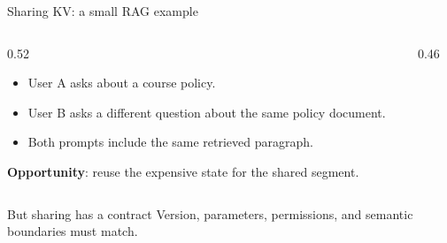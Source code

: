 \documentclass[aspectratio=169,11pt]{beamer}
\newcommand{\key}[1]{\textcolor{HUSTDeep}{\textbf{#1}}}
\begin{document}
\begin{frame}{Sharing KV: a small RAG example}
  \begin{columns}[T,totalwidth=\textwidth]
    \begin{column}{0.52\textwidth}
      \begin{itemize}
        \item User A asks about a course policy.
        \item User B asks a different question about the same policy document.
        \item Both prompts include the same retrieved paragraph.
      \end{itemize}
      \vspace{0.2cm}
      \key{Opportunity}: reuse the expensive state for the shared segment.
    \end{column}
    \begin{column}{0.46\textwidth}
      \centering
    \end{column}
  \end{columns}
  \vspace{0.28cm}
  \begin{block}{But sharing has a contract}
    Version, parameters, permissions, and semantic boundaries must match.
  \end{block}
\end{frame}
\end{document}
